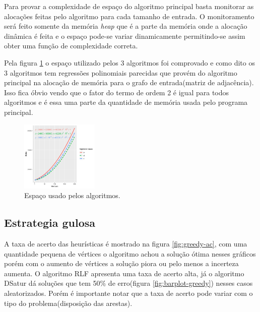 \documentclass[12pt]{article}
\begin{document}
Para provar a complexidade de espaço do algoritmo principal basta monitorar as alocações feitas pelo algoritmo para cada tamanho de entrada. O monitoramento será feito somente da memória \emph{heap} \cite{osthreeeasypieces} que é a parte da memória onde a alocação dinâmica é feita e o espaço pode-se variar dinamicamente permitindo-se assim obter uma função de complexidade correta.

Pela figura \ref{fig:espaco} o espaço utilizado pelos 3 algoritmos foi comprovado e como dito os 3 algoritmos tem regressões polinomiais parecidas que provém do algoritmo principal na alocação de memória para o grafo de entrada(matriz de adjacência).
Isso fica óbvio vendo que o fator do termo de ordem 2 é igual para todos algoritmos e é essa uma parte da quantidade de memória usada pelo programa principal.

\begin{figure}[htbp]
\centering
\includegraphics[width=0.33\textwidth]{espaco.jpg}
\caption{Espaço usado pelos algoritmos.\label{fig:espaco}}
\end{figure}

\subsection{Estrategia gulosa}
\label{sec:org5098f28}

A taxa de acerto das heurísticas é mostrado na figura \ref{fig:greedy-ac}, com uma quantidade pequena de vértices o algoritmo achou a solução ótima nesses gráficos porém com o aumento de vértices a solução piora ou pelo menos a incerteza aumenta. O algoritmo RLF apresenta uma taxa de acerto alta, já o algoritmo DSatur dá soluções que tem 50\% de erro(figura \ref{fig:barplot-greedy}) nesses casos aleatorizados. Porém é importante notar que a taxa de acerto pode variar com o tipo do problema(disposição das arestas).
\end{document}
